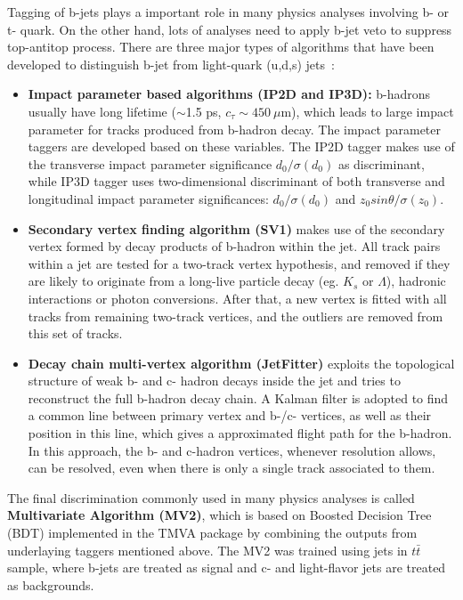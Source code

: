 Tagging of b-jets plays a important role in many physics analyses involving b- or t- quark.
On the other hand, lots of analyses need to apply b-jet veto to suppress top-antitop process.
There are three major types of algorithms that have been developed to distinguish b-jet from light-quark (u,d,s) jets~\cite{ATL-PHYS-PUB-2016-012}:
\begin{itemize}
	\item \textbf{Impact parameter based algorithms (IP2D and IP3D):} b-hadrons usually have long lifetime ($\sim$1.5 ps, $c_{\tau}\sim450~\mu$m), which leads to large impact parameter for tracks produced from b-hadron decay. The impact parameter taggers are developed based on these variables. The IP2D tagger makes use of the transverse impact parameter significance $d_{0}/\sigma(d_{0})$ as discriminant, while IP3D tagger uses two-dimensional discriminant of both transverse and longitudinal impact parameter significances: $d_{0}/\sigma(d_{0})$ and $z_{0}sin\theta/\sigma(z_{0})$.
	\item \textbf{Secondary vertex finding algorithm (SV1)} makes use of the secondary vertex formed by decay products of b-hadron within the jet. All track pairs within a jet are tested for a two-track vertex hypothesis, and removed if they are likely to originate from a long-live particle decay (eg. $K_{s}$ or $\Lambda$), hadronic interactions or photon conversions. After that, a new vertex is fitted with all tracks from remaining two-track vertices, and the outliers are removed from this set of tracks.
	\item \textbf{Decay chain multi-vertex algorithm (JetFitter)}\cite{Piacquadio_2008} exploits the topological structure of weak b- and c- hadron decays inside the jet and tries to reconstruct the full b-hadron decay chain. A Kalman filter is adopted to find a common line between primary vertex and b-/c- vertices, as well as their position in this line, which gives a approximated flight path for the b-hadron. In this approach, the b- and c-hadron vertices, whenever resolution allows, can be resolved, even when there is only a single track associated to them.
\end{itemize}
The final discrimination commonly used in many physics analyses is called \textbf{Multivariate Algorithm (MV2)}, which is based on Boosted Decision Tree (BDT) implemented in the TMVA package\cite{Speckmayer_2010} by combining the outputs from underlaying taggers mentioned above.
The MV2 was trained using jets in $t\bar{t}$ sample, where b-jets are treated as signal and c- and light-flavor jets are treated as backgrounds.
